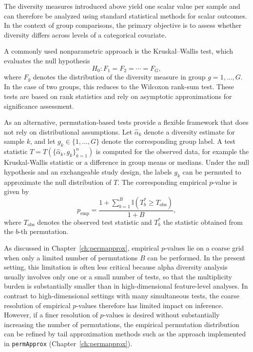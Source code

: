 The diversity measures introduced above yield one scalar value per sample and can therefore be analyzed using standard statistical methods for scalar outcomes. In the context of group comparisons, the primary objective is to assess whether diversity differs across levels of a categorical covariate.

A commonly used nonparametric approach is the Kruskal--Wallis test, which evaluates the null hypothesis
\begin{equation}
H_0: F_1 = F_2 = \cdots = F_G,
\end{equation}
where $F_g$ denotes the distribution of the diversity measure in group $g = 1,\dots,G$. In the case of two groups, this reduces to the Wilcoxon rank-sum test. These tests are based on rank statistics and rely on asymptotic approximations for significance assessment.

As an alternative, permutation-based tests provide a flexible framework that does not rely on distributional assumptions. Let $\hat{\alpha}_k$ denote a diversity estimate for sample $k$, and let $g_k \in \{1,\dots,G\}$ denote the corresponding group label. A test statistic $T = T(\{\hat{\alpha}_k, g_k\}_{k=1}^n)$ is computed for the observed data, for example the Kruskal-Wallis statistic or a difference in group means or medians. Under the null hypothesis and an exchangeable study design, the labels $g_k$ can be permuted to approximate the null distribution of $T$. The corresponding empirical $p$-value is given by
\begin{equation}
p_{\mathrm{emp}} = \frac{1 + \sum_{b=1}^B \mathbb{I}(T_b^* \geq T_{\mathrm{obs}})}{1 + B},
\end{equation}
where $T_{\mathrm{obs}}$ denotes the observed test statistic and $T_b^*$ the statistic obtained from the $b$-th permutation.

As discussed in Chapter~\ref{ch:permapprox}, empirical $p$-values lie on a coarse grid when only a limited number of permutations $B$ can be performed. In the present setting, this limitation is often less critical because alpha diversity analysis usually involves only one or a small number of tests, so that the multiplicity burden is substantially smaller than in high-dimensional feature-level analyses. In contrast to high-dimensional settings with many simultaneous tests, the coarse resolution of empirical $p$-values therefore has limited impact on inference. However, if a finer resolution of $p$-values is desired without substantially increasing the number of permutations, the empirical permutation distribution can be refined by tail approximation methods such as the approach implemented in \texttt{permApprox} (Chapter~\ref{ch:permapprox}).


